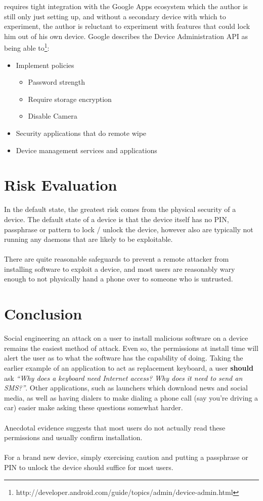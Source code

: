 \documentclass[a4paper]{article}
\begin{document}
requires tight integration with the Google Apps ecosystem which the author is
still only just setting up, and without a secondary device with which to
experiment, the author is reluctant to experiment with features that could lock
him out of his own device. Google describes the Device Administration API as
being able
to\footnote{http://developer.android.com/guide/topics/admin/device-admin.html}:
\begin{itemize}
  \item Implement policies
    \begin{itemize}
      \item Password strength
      \item Require storage encryption
      \item Disable Camera
     \end{itemize}
  \item Security applications that do remote wipe
  \item Device management services and applications 
\end{itemize}

\section{Risk Evaluation}
In the default state, the greatest risk comes from the physical security of a
device. The default state of a device is that the device itself has no PIN,
passphrase or pattern to lock / unlock the device, however also are typically
not running any daemons that are likely to be exploitable.
\\
\\
\noindent There are quite reasonable safeguards to prevent a remote attacker
from installing software to exploit a device, and most users are reasonably wary
enough to not physically hand a phone over to someone who is untrusted.

\section{Conclusion}
Social engineering an attack on a user to install malicious software on a device
remains the easiest method of attack. Even so, the permissions at install time
will alert the user as to what the software has the capability of doing. Taking
the earlier example of an application to act as replacement keyboard, a user
\textbf{should} ask \emph{``Why does a keyboard need Internet access? Why does it
need to send an SMS?''}. Other applications, such as launchers which download
news and social media, as well as having dialers to make dialing a phone call
(say you're driving a car) easier make asking these questions somewhat harder.
\\
\\
\noindent Anecdotal evidence suggests that most users do not actually read these
permissions and usually confirm installation.
\\
\\
\noindent For a brand new device, simply exercising caution and putting a
passphrase or PIN to unlock the device should suffice for most users.
\end{document}
